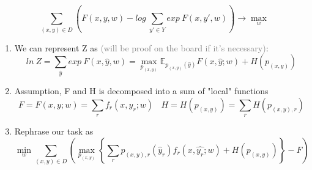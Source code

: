 \documentclass{beamer}
\begin{document}
\begin{frame}
	\begin{tcolorbox}[colback=white!2, colframe=red!90]
		$$\sum_{(x, y) \in D} \left( F(x, y, w) - log~\sum_{y' \in Y} exp~F(x, y', w) \right) \rightarrow \max_{w}$$
	\end{tcolorbox}
	
	\begin{enumerate}
		\item We can represent Z as \small \textcolor{gray}{(will be proof on the board if it's necessary)}:
			$$ln~Z = \sum_{\hat{y}} exp~F(x, \hat{y}, w) = \max_{p_{(x, y)}} \mathbb{E}_{p_{(x, y)}(\hat{y})} F(x, \hat{y}; w) + H(p_{(x, y)})$$
		
		\item Assumption, F and H is decomposed into a sum of "local" functions \small
		$$F = F(x, y; w) = \sum_{r} f_r(x, y_r; w)~~~~H = H(p_{(x, y)}) = \sum_{r} H(p_{(x, y), r})$$
		
		\item Rephrase our task as
		$$\min_w \sum_{(x, y) \in D} \left(\max_{p_{(x, y)}} \left\{ \sum_r p_{(x, y), r} (\hat{y}_r) f_r(x, \hat{y_r}; w) + H(p_{(x, y)})\right\}- F \right) $$
		
	\end{enumerate}
\end{frame}
\end{document}
